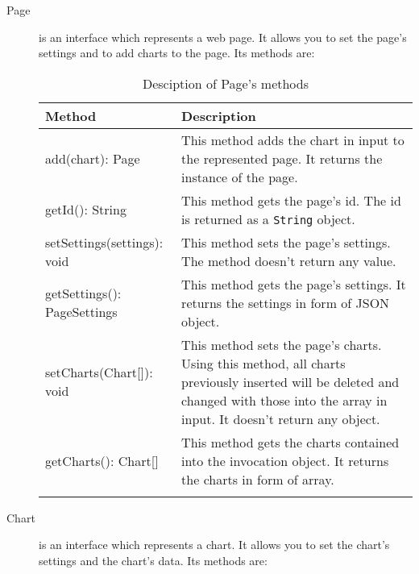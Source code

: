 \begin{description}
		\item[Page] is an interface which represents a web page. It allows you to set the page's settings and to add charts to the page. Its methods are:
			\begin{longtabu}{| X | X |}

			\hline
			\rowfont{\bf}
			Method &
			Description \\
			\hline \endhead
			
				add(chart): Page & This method adds the chart in input to the represented page. It returns the instance of the page. 
				\\ \hline
				getId(): String & This method gets the page's id. The id is returned as a \texttt{String} object.
				\\ \hline
				setSettings(settings): void & This method sets the page's settings. The method doesn't return any value. 
				\\ \hline
				getSettings(): PageSettings & This method gets the page's settings. It returns the settings in form of JSON object. 
				\\ \hline
				setCharts(Chart[]): void & This method sets the page's charts. Using this method, all charts previously inserted will be deleted and changed with those into the array in input. It doesn't return any object. 
				\\ \hline
				getCharts(): Chart[] & This method gets the charts contained into the invocation object. It returns the charts in form of array. 
				\\ \hline
				\caption{Desciption of Page's methods}
			\end{longtabu}
		
		\item[Chart] is an interface which represents a chart. It allows you to set the chart's settings and the chart's data. Its methods are:
			\begin{longtabu}{| X | X |}


\end{longtabu}
\end{description}
